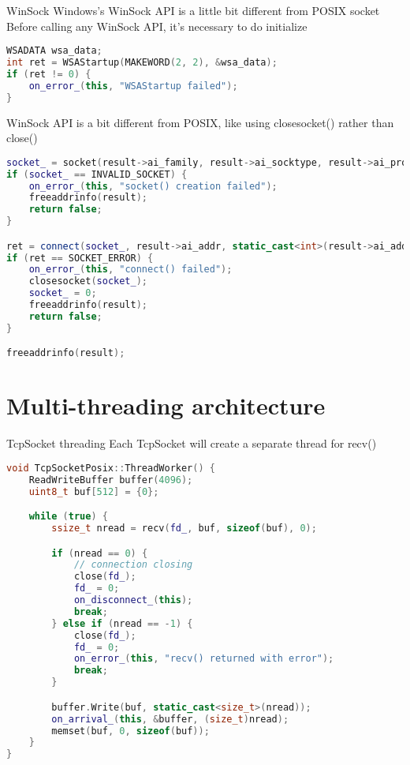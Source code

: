 \documentclass{beamer}
\begin{document}
\begin{frame}[fragile]{WinSock}
{Windows's WinSock API is a little bit different from POSIX socket}
Before calling any WinSock API, it's necessary to do initialize
\begin{lstlisting}[language=c++,basicstyle=\ttfamily\tiny]
WSADATA wsa_data;
int ret = WSAStartup(MAKEWORD(2, 2), &wsa_data);
if (ret != 0) {
    on_error_(this, "WSAStartup failed");
}
\end{lstlisting}
\small{WinSock API is a bit different from POSIX, like using closesocket() rather than close()}
\begin{lstlisting}[language=c++,basicstyle=\ttfamily\tiny]
socket_ = socket(result->ai_family, result->ai_socktype, result->ai_protocol);
if (socket_ == INVALID_SOCKET) {
    on_error_(this, "socket() creation failed");
    freeaddrinfo(result);
    return false;
}

ret = connect(socket_, result->ai_addr, static_cast<int>(result->ai_addrlen));
if (ret == SOCKET_ERROR) {
    on_error_(this, "connect() failed");
    closesocket(socket_);
    socket_ = 0;
    freeaddrinfo(result);
    return false;
}

freeaddrinfo(result);
\end{lstlisting}
\end{frame}


\section{Multi-threading architecture}

\begin{frame}[fragile]{TcpSocket threading}
Each TcpSocket will create a separate thread for recv()
\begin{lstlisting}[language=c++,basicstyle=\ttfamily\tiny]
void TcpSocketPosix::ThreadWorker() {
    ReadWriteBuffer buffer(4096);
    uint8_t buf[512] = {0};

    while (true) {
        ssize_t nread = recv(fd_, buf, sizeof(buf), 0);

        if (nread == 0) {
            // connection closing
            close(fd_);
            fd_ = 0;
            on_disconnect_(this);
            break;
        } else if (nread == -1) {
            close(fd_);
            fd_ = 0;
            on_error_(this, "recv() returned with error");
            break;
        }

        buffer.Write(buf, static_cast<size_t>(nread));
        on_arrival_(this, &buffer, (size_t)nread);
        memset(buf, 0, sizeof(buf));
    }
}
\end{lstlisting}
\end{frame}
\end{document}
